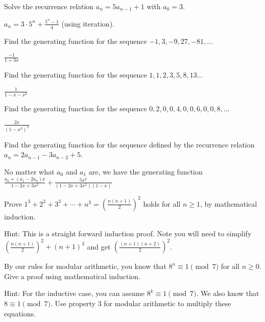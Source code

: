 \begin{squestions}
\question Solve the recurrence relation $a_n = 5 a_{n-1} + 1$ with $a_0 = 3$.

  \begin{answer}
   $a_n = 3\cdot 5^n + \frac{5^n - 1}{4}$ (using iteration).
  \end{answer}



\question Find the generating function for the sequence $-1, 3, -9, 27, -81, \ldots$
  
  \begin{answer}
   $\frac{-1}{1+3x}$
  \end{answer}


\question Find the generating function for the sequence $1, 1, 2, 3, 5, 8, 13 \ldots$

  \begin{answer}
   $\frac{1}{1-x-x^2}$
  \end{answer}

  
\question Find the generating function for the sequence $0, 2, 0, 0, 4, 0, 0, 6, 0, 0, 8, \ldots$

  \begin{answer}
   $\frac{2x}{(1-x^3)^2}$
  \end{answer}


\question Find the generating function for the sequence defined by the recurrence relation $a_n = 2a_{n-1} - 3a_{n-2} + 5$.
  
  \begin{answer}
   No matter what $a_0$ and $a_1$ are, we have the generating function $\frac{a_0 + (a_1 - 2a_0)x}{1-2x + 3x^2} + \frac{5x^2}{(1 - 2x + 3x^2)(1-x)}$
  \end{answer}


\question Prove $1^3 + 2^3 + 3^3 + \cdots + n^3 = \left(\frac{n(n+1)}{2}\right)^2$ holds for all $n \ge 1$, by mathematical induction.

	\begin{answer}
		Hint: This is a straight forward induction proof.  Note you will need to simplify $\left(\frac{n(n+1)}{2}\right)^2 + (n+1)^3$ and get $\left(\frac{(n+1)(n+2)}{2}\right)^2$.
	\end{answer}



\question By our rules for modular arithmetic, you know that $8^n \equiv 1 \pmod{7}$ for all $n \ge 0$.  Give a proof using mathematical induction.

	\begin{answer}
		Hint: For the inductive case, you can assume $8^k \equiv 1 \pmod{7}$.  We also know that $8 \equiv 1 \pmod{7}$.  Use property 3 for modular arithmetic to multiply these equations.
	\end{answer}




\end{squestions}
